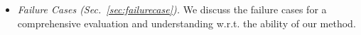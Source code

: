 \begin{itemize}
\begin{itemize}
        \item  \textit{Failure Cases (Sec.~\ref{sec:failurecase}). } We discuss the failure cases for a comprehensive evaluation and understanding w.r.t. the ability of our method. 
    \end{itemize}

\end{itemize}
